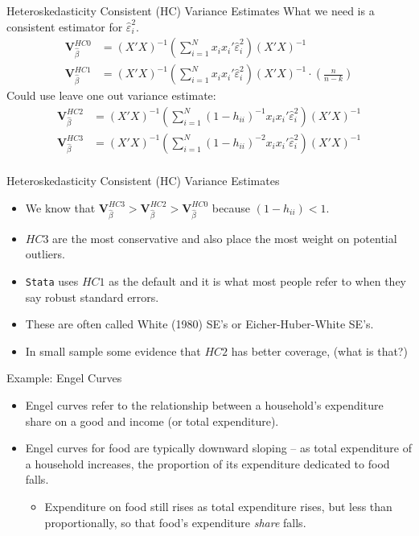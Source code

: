 \documentclass[aspectratio=169,11pt]{beamer}
\begin{document}
\begin{frame}{Heteroskedasticity Consistent (HC) Variance Estimates}
What we need is a consistent estimator for $\hat{\varepsilon}^2_i$.
\begin{align*}
\mathbf{V}_{\widehat{\beta}}^{HC0}&= (X'X)^{-1} \left(\sum_{i=1}^N x_i x_i' \hat{\varepsilon}_i^2 \right) (X'X)^{-1} \\
\mathbf{V}_{\widehat{\beta}}^{HC1}&= (X'X)^{-1} \left(\sum_{i=1}^N x_i x_i' \hat{\varepsilon}_i^2 \right) (X'X)^{-1} \cdot \left(\frac{n}{n-k}  \right)
\end{align*}
Could use leave one out variance estimate:
\begin{align*}
\mathbf{V}_{\widehat{\beta}}^{HC2}&= (X'X)^{-1} \left(\sum_{i=1}^N (1-h_{ii})^{-1} x_i x_i' \hat{\varepsilon}_i^2 \right) (X'X)^{-1} \\
\mathbf{V}_{\widehat{\beta}}^{HC3}&= (X'X)^{-1} \left(\sum_{i=1}^N (1-h_{ii})^{-2} x_i x_i' \hat{\varepsilon}_i^2 \right) (X'X)^{-1} \\
\end{align*}
\end{frame}

\begin{frame}{Heteroskedasticity Consistent (HC) Variance Estimates}
\begin{itemize}
\item We know that $\mathbf{V}_{\widehat{\beta}}^{HC3} > \mathbf{V}_{\widehat{\beta}}^{HC2} > \mathbf{V}_{\widehat{\beta}}^{HC0}$ because $(1- h_{ii}) <1$.
\item $HC3$ are the most \alert{conservative} and also place the most weight on potential outliers.
\item \texttt{Stata} uses $HC1$ as the default and it is what most people refer to when they say \alert{robust standard errors}.
\item These are often called White (1980) SE's or Eicher-Huber-White SE's.
\item In small sample some evidence that $HC2$ has better \alert{coverage}, (what is that?)
\end{itemize}
\end{frame}




\begin{frame}{Example: Engel Curves}
\begin{itemize}
	\item Engel curves refer to the relationship between a household's expenditure share on a 
	good and income (or total expenditure).

	\item Engel curves for food are typically downward sloping -- as total expenditure of a household
	increases, the proportion of its expenditure dedicated to food falls.
	\begin{itemize}
		\item Expenditure on food still rises as total expenditure rises, but less than proportionally,
		so that food's expenditure \emph{share} falls.
	\end{itemize}
\end{itemize}
\end{frame}
\end{document}
